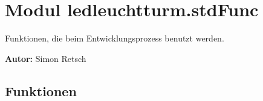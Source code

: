 %
%
%


\section{Modul ledleuchtturm.stdFunc}

    \label{ledleuchtturm:stdFunc}
Funktionen, die beim Entwicklungsprozess benutzt werden.

\textbf{Autor:} Simon Retsch





  \subsection{Funktionen}

    \label{ledleuchtturm:stdFunc:printConfigSettings}

    \vspace{0.5ex}

